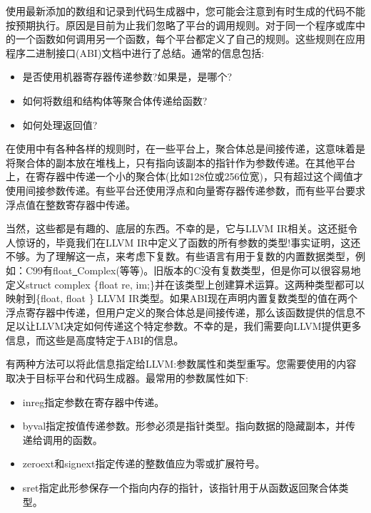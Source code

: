 
使用最新添加的数组和记录到代码生成器中，您可能会注意到有时生成的代码不能按预期执行。原因是目前为止我们忽略了平台的调用规则。对于同一个程序或库中的一个函数如何调用另一个函数，每个平台都定义了自己的规则。这些规则在应用程序二进制接口(ABI)文档中进行了总结。通常的信息包括:\par

\begin{itemize}
	\item 是否使用机器寄存器传递参数?如果是，是哪个?
	\item 如何将数组和结构体等聚合体传递给函数?
	\item 如何处理返回值?
\end{itemize}

在使用中有各种各样的规则时，在一些平台上，聚合体总是间接传递，这意味着是将聚合体的副本放在堆栈上，只有指向该副本的指针作为参数传递。在其他平台上，在寄存器中传递一个小的聚合体(比如128位或256位宽)，只有超过这个阈值才使用间接参数传递。有些平台还使用浮点和向量寄存器传递参数，而有些平台要求浮点值在整数寄存器中传递。\par

当然，这些都是有趣的、底层的东西。不幸的是，它与LLVM IR相关。这还挺令人惊讶的，毕竟我们在LLVM IR中定义了函数的所有参数的类型!事实证明，这还不够。为了理解这一点，来考虑下复数。有些语言有用于复数的内置数据类型，例如：C99有float\underline{~}Complex(等等)。旧版本的C没有复数类型，但是你可以很容易地定义struct complex \{float re, im;\}并在该类型上创建算术运算。这两种类型都可以映射到\{float, float \} LLVM IR类型。如果ABI现在声明内置复数类型的值在两个浮点寄存器中传递，但用户定义的聚合体总是间接传递，那么该函数提供的信息不足以让LLVM决定如何传递这个特定参数。不幸的是，我们需要向LLVM提供更多信息，而这些是高度特定于ABI的信息。\par

有两种方法可以将此信息指定给LLVM:参数属性和类型重写。您需要使用的内容取决于目标平台和代码生成器。最常用的参数属性如下:\par

\begin{itemize}
	\item inreg指定参数在寄存器中传递。
	\item byval指定按值传递参数。形参必须是指针类型。指向数据的隐藏副本，并传递给调用的函数。
	\item zeroext和signext指定传递的整数值应为零或扩展符号。
	\item sret指定此形参保存一个指向内存的指针，该指针用于从函数返回聚合体类型。
\end{itemize}

